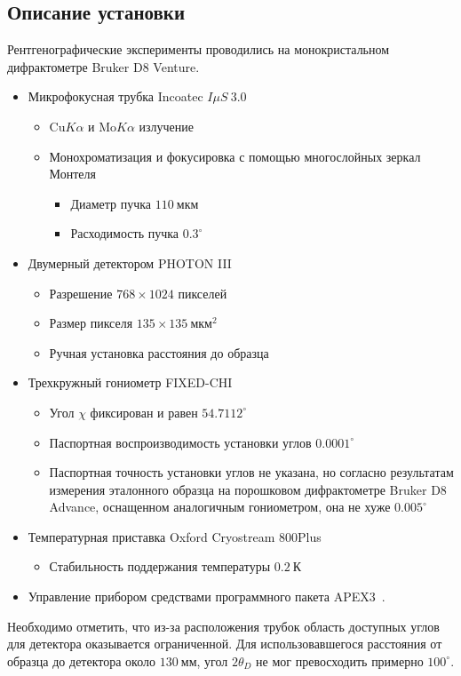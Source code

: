 \documentclass[a4paper,14pt]{extarticle}
\newcommand{\unit}[1]{ \ \text{#1}}
\newcommand{\degree}{^\circ}
\begin{document}
\subsection{Описание установки}
Рентгенографические эксперименты проводились на монокристальном дифрактометре Bruker D8 Venture.
\begin{itemize}
    \item Микрофокусная трубка Incoatec $I \mu S \ 3.0$
    \begin{itemize}
        \item $\text{Cu} K\alpha$ и $\text{Mo} K\alpha$ излучение
        \item Монохроматизация и фокусировка с помощью многослойных зеркал Монтеля
        \begin{itemize}
            \item Диаметр пучка $110\unit{мкм}$
            \item Расходимость пучка $0.3\degree$
        \end{itemize}
    \end{itemize}
    \item Двумерный детектором PHOTON III
    \begin{itemize}
        \item Разрешение $768 \times 1024$ пикселей
        \item Размер пикселя $135 \times 135\unit{мкм}^2$
        \item Ручная установка расстояния до образца
    \end{itemize}
    \item Трехкружный гониометр FIXED-CHI
    \begin{itemize}
        \item Угол $\chi$ фиксирован и равен $54.7112\degree$
        \item Паспортная воспроизводимость установки углов $0.0001\degree$
        \item Паспортная точность установки углов не указана, но согласно результатам измерения эталонного образца на порошковом дифрактометре Bruker D8 Advance, оснащенном аналогичным гониометром, она не хуже $0.005\degree$
    \end{itemize}
    \item Температурная приставка Oxford Cryostream 800Plus
    \begin{itemize}
            \item Стабильность поддержания температуры $0.2\unit{К}$
    \end{itemize}
    \item Управление прибором средствами программного пакета APEX3~\cite{Bruker:2019}.
\end{itemize}
Необходимо отметить, что из-за расположения трубок область доступных углов для детектора оказывается ограниченной.
Для использовавшегося расстояния от образца до детектора около $130\unit{мм}$, угол $2\theta_D$ не мог превосходить примерно $100\degree$.
\end{document}
